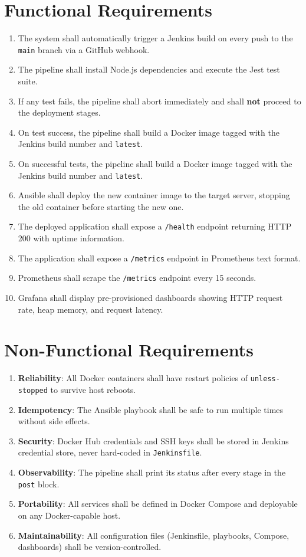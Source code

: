 \documentclass[12pt,a4paper]{report}
\begin{document}
\section{Functional Requirements}
\begin{enumerate}
    \item The system shall automatically trigger a Jenkins build on every push to the \texttt{main} branch via a GitHub webhook.
    \item The pipeline shall install Node.js dependencies and execute the Jest test suite.
    \item If any test fails, the pipeline shall abort immediately and shall \textbf{not} proceed to the deployment stages.
    \item On test success, the pipeline shall build a Docker image tagged with the Jenkins build number and \texttt{latest}.
    \item On successful tests, the pipeline shall build a Docker image tagged with the Jenkins build number and \texttt{latest}.
    \item Ansible shall deploy the new container image to the target server, stopping the old container before starting the new one.
    \item The deployed application shall expose a \texttt{/health} endpoint returning HTTP 200 with uptime information.
    \item The application shall expose a \texttt{/metrics} endpoint in Prometheus text format.
    \item Prometheus shall scrape the \texttt{/metrics} endpoint every 15 seconds.
    \item Grafana shall display pre-provisioned dashboards showing HTTP request rate, heap memory, and request latency.
\end{enumerate}

\section{Non-Functional Requirements}
\begin{enumerate}
    \item \textbf{Reliability}: All Docker containers shall have restart policies of \texttt{unless-stopped} to survive host reboots.
    \item \textbf{Idempotency}: The Ansible playbook shall be safe to run multiple times without side effects.
    \item \textbf{Security}: Docker Hub credentials and SSH keys shall be stored in Jenkins credential store, never hard-coded in \texttt{Jenkinsfile}.
    \item \textbf{Observability}: The pipeline shall print its status after every stage in the \texttt{post} block.
    \item \textbf{Portability}: All services shall be defined in Docker Compose and deployable on any Docker-capable host.
    \item \textbf{Maintainability}: All configuration files (Jenkinsfile, playbooks, Compose, dashboards) shall be version-controlled.
\end{enumerate}
\end{document}
